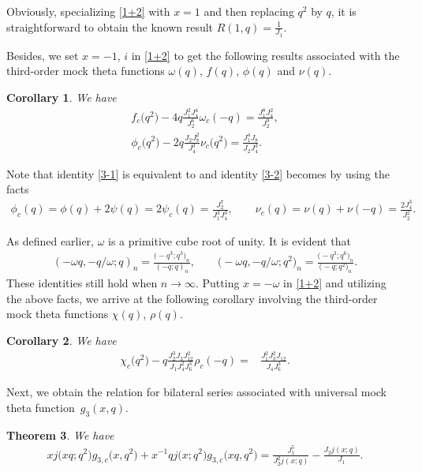 \documentclass[10pt,a4paper]{amsart}
\numberwithin{equation}{section}
\newtheorem{Theorem}{Theorem}[section]
\newtheorem{Corollary}[Theorem]{Corollary}
\begin{document}
Obviously, specializing \eqref{1+2} with $x=1$ and then replacing $q^2$ by $q$, it is straightforward to obtain the known result
$
R(1,q)=\frac{1}{J_1}$.

Besides, we set $x=-1$, $i$ in \eqref{1+2} to get the following results associated with the third-order mock theta functions $\omega(q)$, $f(q)$, $\phi(q)$ and $\nu(q)$.

 \begin{Corollary}%
We have
\begin{gather}
f_c\bigl(q^2\bigr)-4q\frac{J_1^2J_4^4}{J_2^6}\omega_c(-q)
=\frac{J_1^8J_4^2}{J_2^9},\label{3-1}\\
\phi_c\bigl(q^2\bigr)-2q\frac{J_2J_8^2}{J_4^3}\nu_c\bigl(q^2\bigr)
=\frac{J_1^4J_8}{J_2J_4^3}.\label{3-2}
\end{gather}
\end{Corollary}
Note that identity \eqref{3-1} is equivalent to \cite[equation (9)]{ZS} and identity \eqref{3-2} becomes \cite[Corollary 2.2]{HZ} by using the facts \cite{BKLMR,Mc}
\begin{gather*}
\phi_c(q)=\phi(q)+2\psi(q)=2\psi_c(q)=\frac{J_2^7}{J_1^3J_4^3},\qquad
\nu_c(q)=\nu(q)+\nu(-q)=\frac{2J_4^3}{J_2^2}.
\end{gather*}



As defined earlier, $\omega$ is a primitive cube root of unity. It is evident that
\begin{gather*}
(-\omega q,-q/\omega;q)_n=\frac{\bigl(-q^3;q^3\bigr)_n}{(-q;q)_n},\qquad
\bigl(-\omega q,-q/\omega;q^2\bigr)_n=\frac{\bigl(-q^3;q^6\bigr)_n}{\bigl(-q;q^2\bigr)_n}.
\end{gather*}
These identities still hold when $n\rightarrow \infty$. Putting $x=-\omega$ in \eqref{1+2} and utilizing the above facts, we arrive at the following corollary involving the third-order mock theta functions $\chi(q)$, $\rho(q)$.
\begin{Corollary}
We have
\begin{align}
\label{0+3}
\chi_c\bigl(q^2\bigr)-q\frac{J_2^3J_3J_{12}^2}{J_1J_4^2J_6^3}\rho_c(-q)
=&\frac{J_1^2J_3^2J_{12}}{J_4J_6^3}.
\end{align}
\end{Corollary}

Next, we obtain the relation for bilateral series associated with universal mock theta function~$g_3(x,q)$.

\begin{Theorem}\label{5+1}
We have
\begin{align}\label{5+2}
xj\bigl(xq;q^2\bigr)g_{3,c}\bigl(x,q^2\bigr)+x^{-1}qj\bigl(x;q^2\bigr)g_{3,c}\bigl(xq,q^2\bigr)
=\frac{J_1^5}{J_2^2j(x;q)}-\frac{J_2j(x;q)}{J_1}.
\end{align}
\end{Theorem}
\end{document}
